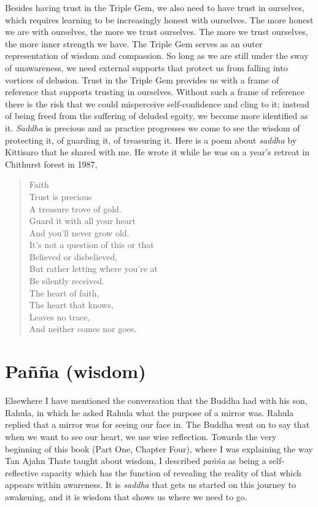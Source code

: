 Besides having trust in the Triple Gem, we also need to have trust in
ourselves, which requires learning to be increasingly honest with
ourselves. The more honest we are with ourselves, the more we trust
ourselves. The more we trust ourselves, the more inner strength we have.
The Triple Gem serves as an outer representation of wisdom and
compassion. So long as we are still under the sway of unawareness, we
need external supports that protect us from falling into vortices of
delusion. Trust in the Triple Gem provides us with a frame of reference
that supports trusting in ourselves. Without such a frame of reference
there is the risk that we could misperceive self-confidence and cling to
it; instead of being freed from the suffering of deluded egoity, we
become more identified as it. \emph{Saddha} is precious and as practice
progresses we come to see the wisdom of protecting it, of guarding it,
of treasuring it. Here is a poem about \emph{saddha} by Kittisaro that
he shared with me. He wrote it while he was on a year's retreat in
Chithurst forest in 1987,

\begin{quote}
  Faith\\
  Trust is precious\\
  A treasure trove of gold.\\
  Guard it with all your heart\\
  And you'll never grow old.\\
  It's not a question of this or that\\
  Believed or disbelieved,\\
  But rather letting where you're at\\
  Be silently received.\\
  The heart of faith,\\
  The heart that knows,\\
  Leaves no trace,\\
  And neither comes nor goes.\\
\end{quote}

\section{Pañña (wisdom)}

Elsewhere I have mentioned the conversation that the Buddha had with his
son, Rahula, in which he asked Rahula what the purpose of a mirror was.
Rahula replied that a mirror was for seeing our face in. The Buddha went
on to say that when we want to see our heart, we use wise reflection.
Towards the very beginning of this book (Part One, Chapter Four), where
I was explaining the way Tan Ajahn Thate taught about wisdom, I
described \emph{pañña} as being a self-reflective capacity which has the
function of revealing the reality of that which appears within
awareness. It is \emph{saddha} that gets us started on this journey to
awakening, and it is wisdom that shows us where we need to go.

